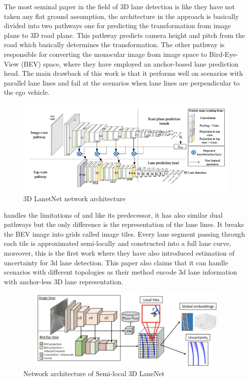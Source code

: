 The most seminal paper in the field of 3D lane detection is \cite{DBLP:journals/corr/abs-1811-10203} like \cite{DBLP:journals/corr/abs-1802-05591} they have not taken any flat ground assumption, the architecture in the approach is basically divided into two pathways one for predicting the transformation from image plane to 3D road plane. This pathway predicts camera height and pitch from the road which basically determines the transformation. The other pathway is responsible for converting the monocular image from image space to Bird-Eye-View (BEV) space, where they have employed an anchor-based lane prediction head. The main drawback of this work is that it performs well on scenarios with parallel lane lines and fail at the scenarios when lane lines are perpendicular to the ego vehicle. 

\begin{figure}[h]
    \centering
    \includegraphics[width=\textwidth]{images/3dlanenet.png}
    \caption{\cite{c} 3D LanetNet network architecture}
    \end{figure}

\cite{DBLP:journals/corr/abs-2011-01535} handles the limitations of \cite{DBLP:journals/corr/abs-1811-10203} and like its predecessor, it has also similar dual pathways but the only difference is the representation of the lane lines. It breaks the BEV image into grids called image tiles.
Every lane segment passing through each tile is approximated semi-locally and constructed into a full lane curve, moreover, this is the first work where they have also introduced estimation of uncertainty for 3d lane detection. This paper also claims that it can handle scenarios with different topologies as their method encode 3d lane information with anchor-less 3D lane representation. 

 \begin{figure}[h]
    \centering
    \includegraphics[width=12cm, height=4cm]{images/3DLaneNET++.png}
    \caption{Network architecture of Semi-local 3D LaneNet \cite{DBLP:journals/corr/abs-2011-01535}}
    \end{figure}

